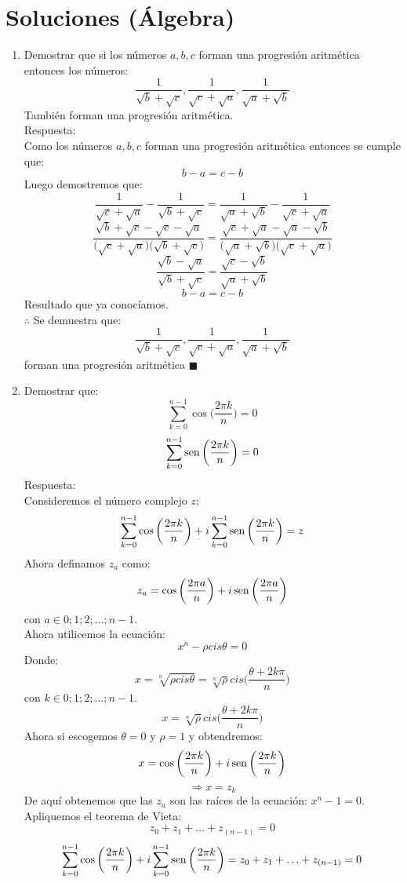 \documentclass{book}
\newcommand{\sen}{\mathop{\rm sen}\nolimits} %
\begin{document}
		\section{Soluciones (Álgebra)}
			\begin{enumerate}
				\item Demostrar que si los números $a,b,c$ forman una progresión aritmética entonces los números: 
				$$\frac{1}{\sqrt{b}+\sqrt{c}},\frac{1}{\sqrt{c}+\sqrt{a}},\frac{1}{\sqrt{a}+\sqrt{b}}$$
				También forman una progresión aritmética.\\
				Respuesta:\\
				Como los números $a,b,c$ forman una progresión aritmética entonces se cumple que:
$$b-a=c-b$$
Luego demostremos que:
$$\frac{1}{\sqrt{c}+\sqrt{a}}-\frac{1}{\sqrt{b}+\sqrt{c}}=\frac{1}{\sqrt{a}+\sqrt{b}}-\frac{1}{\sqrt{c}+\sqrt{a}}$$  
$$\frac{\sqrt{b}+\sqrt{c}-\sqrt{c}-\sqrt{a}}{\big(\sqrt{c}+\sqrt{a}\big)\big(\sqrt{b}+\sqrt{c}\big)} =\frac{\sqrt{c}+\sqrt{a}-\sqrt{a}-\sqrt{b}}{\big(\sqrt{a}+\sqrt{b}\big)\big(\sqrt{c}+\sqrt{a}\big)} $$
$$\frac{\sqrt{b}-\sqrt{a}}{\sqrt{b}+\sqrt{c}}=\frac{\sqrt{c}-\sqrt{b}}{\sqrt{a}+\sqrt{b}}$$
$$b-a=c-b$$
Resultado que ya conocíamos.\\
$\therefore$ Se demuestra que:
$$\frac{1}{\sqrt{b}+\sqrt{c}},\frac{1}{\sqrt{c}+\sqrt{a}},\frac{1}{\sqrt{a}+\sqrt{b}}$$
forman una progresión aritmética $\blacksquare$\\
				\item Demostrar que: 
				$$ \sum_{k=0}^{n-1}\cos{\bigg(\frac{2\pi k}{n}\bigg)}=0$$
				$$ \sum_{k=0}^{n-1}\sen{\bigg(\frac{2\pi k}{n}\bigg)}=0$$
				Respuesta:\\
				Consideremos el número complejo $z$:
$$\sum_{k=0}^{n-1}\cos{\bigg(\frac{2\pi k}{n}\bigg)} +i\sum_{k=0}^{n-1}\sen{\bigg(\frac{2\pi k}{n}\bigg)} =z$$
Ahora definamos $z_a$ como:
$$z_a=\cos{\bigg(\frac{2\pi a}{n}\bigg)} +i\sen{\bigg(\frac{2\pi a}{n}\bigg)}$$
con $a \in {0;1;2;…;n-1}$.\\
Ahora utilicemos la ecuación:
$$x^n-\rho cis\theta=0$$
Donde:
$$x=\sqrt[n]{\rho cis\theta}=\sqrt[n]{\rho}cis\bigg(\frac{\theta+2k\pi}{n}\bigg)$$
con $k \in {0;1;2;…;n-1}$.
$$x=\sqrt[n]{\rho}cis\bigg(\frac{\theta+2k\pi}{n}\bigg)$$
Ahora si escogemos $\theta=0$ y $\rho=1$ y obtendremos:
$$x=\cos{\bigg(\frac{2\pi k}{n}\bigg)} +i\sen{\bigg(\frac{2\pi k}{n}\bigg)}$$
$$\Rightarrow x=z_k$$
De aquí obtenemos que las $z_a$ son las raíces de la ecuación:   $x^n-1=0$. Apliquemos el teorema de Vieta:
$$z_0+z_1+\ldots+z_(n-1)=0$$
$$\sum_{k=0}^{n-1}\cos{\bigg(\frac{2\pi k}{n}\bigg)} +i\sum_{k=0}^{n-1}\sen{\bigg(\frac{2\pi k}{n}\bigg)}=z_0+z_1+\ldots+z_{(n-1)}=0$$

\end{enumerate}
\end{document}
